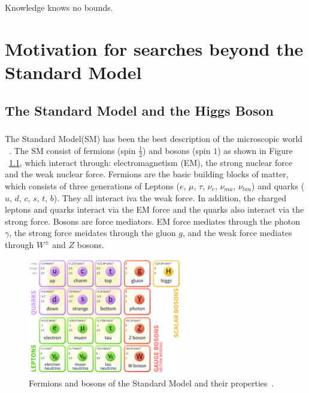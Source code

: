 \begin{savequote}[75mm]
Knowledge knows no bounds.
\end{savequote}

\chapter{Motivation for searches beyond the Standard Model}

\section{The Standard Model and the Higgs Boson}
\paragraph{}
The Standard Model(SM) has been the best description of the microscopic world ~\cite{Griffiths,Tully,Pdg,Schwartz}. 
The SM consist of fermions (spin $\frac{1}{2}$) and bosons (spin $1$) as shown in Figure ~\ref{fig:SM}, which interact through: electromagnetism (EM), the strong nuclear force and the weak nuclear force. 
Fermions are the basic building blocks of matter, which consists of three generations of Leptons ($e$, $\mu$, $\tau$, $\nu_e$, $\nu_{mu}$, $\nu_{tau}$) and quarks ($u$, $d$, $c$, $s$, $t$, $b$). 
They all interact iva the weak force. In addition, the charged leptons and quarks interact via the EM force and the quarks also interact via the strong force. 
Bosons are force mediators. EM force mediates through the photon $\gamma$, the strong force meidates through the gluon $g$, and the weak force mediates through $W^{\pm}$ and $Z$ bosons.

\begin{figure}[h!]
  \centering
  \captionsetup{justification=centering}
  \includegraphics[width=0.6\textwidth]{figures/theory/SM}
  \caption{Fermions and bosons of the Standard Model and their properties~\cite{Pdg}.}
  \label{fig:SM}
\end{figure}

